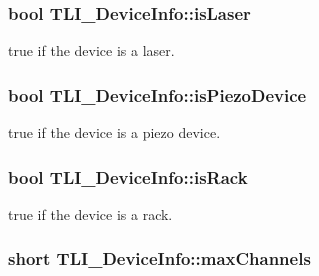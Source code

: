 \subsubsection[{\texorpdfstring{is\+Laser}{isLaser}}]{\setlength{\rightskip}{0pt plus 5cm}bool T\+L\+I\+\_\+\+Device\+Info\+::is\+Laser}\hypertarget{struct_t_l_i___device_info_afb1c8b9fe2db839989f99d975ab83858}{}\label{struct_t_l_i___device_info_afb1c8b9fe2db839989f99d975ab83858}


{\ttfamily true} if the device is a laser. 

\subsubsection[{\texorpdfstring{is\+Piezo\+Device}{isPiezoDevice}}]{\setlength{\rightskip}{0pt plus 5cm}bool T\+L\+I\+\_\+\+Device\+Info\+::is\+Piezo\+Device}\hypertarget{struct_t_l_i___device_info_aaf0ff2a1be0eea8157894f9f2bfbc323}{}\label{struct_t_l_i___device_info_aaf0ff2a1be0eea8157894f9f2bfbc323}


{\ttfamily true} if the device is a piezo device. 

\subsubsection[{\texorpdfstring{is\+Rack}{isRack}}]{\setlength{\rightskip}{0pt plus 5cm}bool T\+L\+I\+\_\+\+Device\+Info\+::is\+Rack}\hypertarget{struct_t_l_i___device_info_a1473c581c566934b35fc56dc4699f975}{}\label{struct_t_l_i___device_info_a1473c581c566934b35fc56dc4699f975}


{\ttfamily true} if the device is a rack. 

\subsubsection[{\texorpdfstring{max\+Channels}{maxChannels}}]{\setlength{\rightskip}{0pt plus 5cm}short T\+L\+I\+\_\+\+Device\+Info\+::max\+Channels}\hypertarget{struct_t_l_i___device_info_a1f52f050d40870aa0cf566ce42774853}{}\label{struct_t_l_i___device_info_a1f52f050d40870aa0cf566ce42774853}


